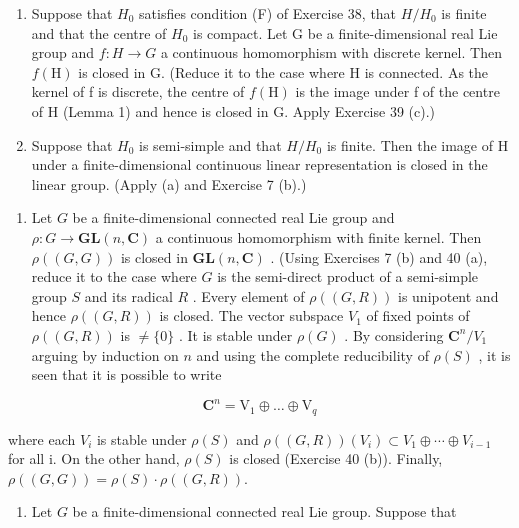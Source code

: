 \begin{enumerate}
\def\labelenumi{(\alph{enumi})}
\item
  Suppose that \(H_{0}\) satisfies condition (F) of Exercise 38, that \(H/H_{0}\) is finite and that the centre of \(H_{0}\) is compact. Let G be a finite-dimensional real Lie group and \(f:H\to G\) a continuous homomorphism with discrete kernel. Then \(f(\mathrm{H})\) is closed in G. (Reduce it to the case where H is connected. As the kernel of f is discrete, the centre of \(f(\mathrm{H})\) is the image under f of the centre of H (Lemma 1) and hence is closed in G. Apply Exercise 39 (c).)
\item
  Suppose that \(H_{0}\) is semi-simple and that \(H/H_{0}\) is finite. Then the image of H under a finite-dimensional continuous linear representation is closed in the linear group. (Apply (a) and Exercise 7 (b).)
\end{enumerate}

\begin{enumerate}
\def\labelenumi{\arabic{enumi}.}
\setcounter{enumi}{40}
\tightlist
\item
  Let \(G\) be a finite-dimensional connected real Lie group and \(\rho: G \to \mathbf{GL}(n, \mathbf{C})\) a continuous homomorphism with finite kernel. Then \(\rho((G, G))\) is closed in \(\mathbf{GL}(n, \mathbf{C})\) . (Using Exercises 7 (b) and 40 (a), reduce it to the case where \(G\) is the semi-direct product of a semi-simple group \(S\) and its radical \(R\) . Every element of \(\rho((G, R))\) is unipotent and hence \(\rho((G, R))\) is closed. The vector subspace \(V_1\) of fixed points of \(\rho((G, R))\) is \(\neq \{0\}\) . It is stable under \(\rho(G)\) . By considering \(\mathbf{C}^n / V_1\) arguing by induction on \(n\) and using the complete reducibility of \(\rho(S)\) , it is seen that it is possible to write
\end{enumerate}

\[
\mathbf {C} ^ {n} = \mathrm{V} _ {1} \oplus \dots \oplus \mathrm{V} _ {q}
\]

where each \(V_{i}\) is stable under \(\rho(S)\) and \(\rho((G,R))(V_{i})\subset V_{1}\oplus\cdots\oplus V_{i-1}\) for all i. On the other hand, \(\rho(S)\) is closed (Exercise 40 (b)). Finally, \(\rho((G,G))=\rho(S)\cdot\rho((G,R)).\)

\begin{enumerate}
\def\labelenumi{\arabic{enumi}.}
\setcounter{enumi}{41}
\tightlist
\item
  Let \(G\) be a finite-dimensional connected real Lie group. Suppose that
\end{enumerate}

